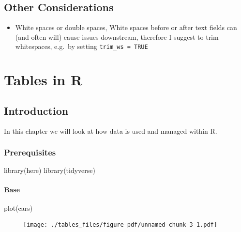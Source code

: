 \documentclass[
  letterpaper,
  DIV=11,
  numbers=noendperiod]{scrreprt}
\newenvironment{Shaded}{\begin{snugshade}}{\end{snugshade}}
\newcommand{\FunctionTok}[1]{\textcolor[rgb]{0.28,0.35,0.67}{#1}}
\newcommand{\NormalTok}[1]{\textcolor[rgb]{0.00,0.23,0.31}{#1}}
\providecommand{\tightlist}{%
  \setlength{\itemsep}{0pt}\setlength{\parskip}{0pt}}\usepackage{longtable,booktabs,array}
\begin{document}
\hypertarget{other-considerations}{%
\section{Other Considerations}\label{other-considerations}}

\begin{itemize}
\tightlist
\item
  White spaces or double spaces, White spaces before or after text
  fields can (and often will) cause issues downstream, therefore I
  suggest to trim whitespaces, e.g.~by setting
  \texttt{trim\_ws\ =\ TRUE}
\end{itemize}

\hypertarget{tables-in-r}{%
\chapter{Tables in R}\label{tables-in-r}}

\hypertarget{introduction-1}{%
\section{Introduction}\label{introduction-1}}

In this chapter we will look at how data is used and managed within R.

\hypertarget{prerequisites-1}{%
\subsection{Prerequisites}\label{prerequisites-1}}

\begin{Shaded}
\begin{Highlighting}[]
\FunctionTok{library}\NormalTok{(here)}
\FunctionTok{library}\NormalTok{(tidyverse)}
\end{Highlighting}
\end{Shaded}

\hypertarget{base}{%
\subsubsection{Base}\label{base}}

\begin{Shaded}
\begin{Highlighting}[]
\FunctionTok{plot}\NormalTok{(cars)}
\end{Highlighting}
\end{Shaded}

\begin{figure}[H]

{\centering \texttt{[image: ./tables\_files/figure-pdf/unnamed-chunk-3-1.pdf]}

}

\end{figure}
\end{document}
